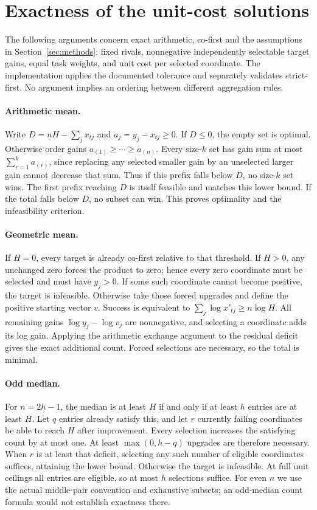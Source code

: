 \section{Exactness of the unit-cost solutions}
\label{app:proofs}
The following arguments concern exact arithmetic, co-first and the assumptions in Section~\ref{sec:methods}: fixed rivals, nonnegative independently selectable target gains, equal task weights, and unit cost per selected coordinate. The implementation applies the documented tolerance and separately validates strict-first. No argument implies an ordering between different aggregation rules.

\paragraph{Arithmetic mean.}
Write $D=nH-\sum_jx_{tj}$ and $a_j=y_j-x_{tj}\geq0$. If $D\leq0$, the empty set is optimal. Otherwise order gains $a_{(1)}\geq\cdots\geq a_{(n)}$. Every size-$k$ set has gain sum at most $\sum_{r=1}^k a_{(r)}$, since replacing any selected smaller gain by an unselected larger gain cannot decrease that sum. Thus if this prefix falls below $D$, no size-$k$ set wins. The first prefix reaching $D$ is itself feasible and matches this lower bound. If the total falls below $D$, no subset can win. This proves optimality and the infeasibility criterion.

\paragraph{Geometric mean.}
If $H=0$, every target is already co-first relative to that threshold. If $H>0$, any unchanged zero forces the product to zero; hence every zero coordinate must be selected and must have $y_j>0$. If some such coordinate cannot become positive, the target is infeasible. Otherwise take those forced upgrades and define the positive starting vector $v$. Success is equivalent to $\sum_j\log x'_{tj}\geq n\log H$. All remaining gains $\log y_j-\log v_j$ are nonnegative, and selecting a coordinate adds its log gain. Applying the arithmetic exchange argument to the residual deficit gives the exact additional count. Forced selections are necessary, so the total is minimal.

\paragraph{Odd median.}
For $n=2h-1$, the median is at least $H$ if and only if at least $h$ entries are at least $H$. Let $q$ entries already satisfy this, and let $r$ currently failing coordinates be able to reach $H$ after improvement. Every selection increases the satisfying count by at most one. At least $\max(0,h-q)$ upgrades are therefore necessary. When $r$ is at least that deficit, selecting any such number of eligible coordinates suffices, attaining the lower bound. Otherwise the target is infeasible. At full unit ceilings all entries are eligible, so at most $h$ selections suffice. For even $n$ we use the actual middle-pair convention and exhaustive subsets; an odd-median count formula would not establish exactness there.

